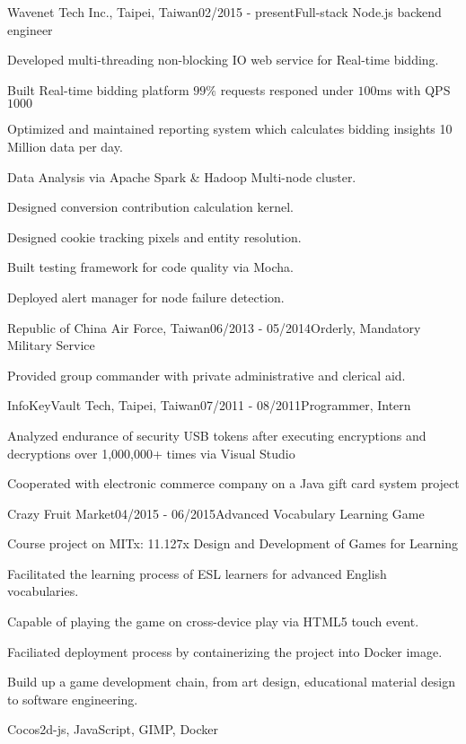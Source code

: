 \documentclass{joel_cv}
\begin{document}
\begin{sectionContentNormal}{Wavenet Tech Inc., Taipei, Taiwan}{02/2015 - present}{Full-stack Node.js backend engineer}
  \item Developed multi-threading non-blocking IO web service for Real-time bidding.
  \item Built Real-time bidding platform $99\%$ requests responed under $100$ms with QPS $1000$
  \item Optimized and maintained reporting system which calculates bidding insights 10 Million data per day.
  \item Data Analysis via Apache Spark \& Hadoop Multi-node cluster.
  \item Designed conversion contribution calculation kernel.
  \item Designed cookie tracking pixels and entity resolution.
  \item Built testing framework for code quality via Mocha.
  \item Deployed alert manager for node failure detection.
\end{sectionContentNormal}

\begin{sectionContentNormal}{Republic of China Air Force, Taiwan}{06/2013 - 05/2014}{Orderly, Mandatory Military Service}
  \item Provided group commander with private administrative and clerical aid.
\end{sectionContentNormal}

\begin{sectionContentNormal}{InfoKeyVault Tech, Taipei, Taiwan}{07/2011 - 08/2011}{Programmer, Intern}
  \item Analyzed endurance of security USB tokens after executing encryptions and decryptions over 1,000,000+ times via Visual Studio
  \item Cooperated with electronic commerce company on a Java gift card system project
\end{sectionContentNormal}


%
%


\begin{sectionContentNormal}{Crazy Fruit Market}{04/2015 - 06/2015}{Advanced Vocabulary Learning Game}
  \item Course project on MITx: 11.127x Design and Development of Games for Learning
  \item Facilitated the learning process of ESL learners for advanced English vocabularies.
  \item Capable of playing the game on cross-device play via HTML5 touch event.
  \item Faciliated deployment process by containerizing the project into Docker image.
  \item Build up a game development chain, from art design, educational material design to software engineering.
  \item Cocos2d-js, JavaScript, GIMP, Docker
\end{sectionContentNormal}
\end{document}
